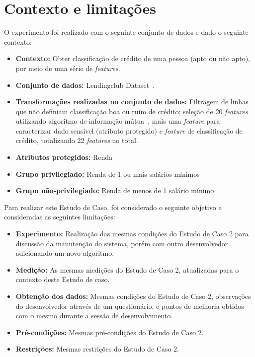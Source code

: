 \documentclass[portugues]{ic-tese}
\begin{document}
\section{Contexto e limitações}

O experimento foi realizado com o seguinte conjunto de dados e dado o seguinte contexto:

\begin{itemize}
\item \textbf{Contexto:} Obter classificação de crédito de uma pessoa (apto ou não apto), por meio de uma série de \textit{features}.

\item \textbf{Conjunto de dados:} Lendingclub Dataset~\citep{lendingclub_2022}.

\item \textbf{Transformações realizadas no conjunto de dados:} Filtragem de linhas que não definiam classificação boa ou ruim de crédito; seleção de 20 \textit{features} utilizando algoritmo de informação mútua~\citep{Ross_2014}, mais uma \textit{feature} para caracterizar dado sensível (atributo protegido) e \textit{feature} de classificação de crédito, totalizando 22 \textit{features} no total.

\item \textbf{Atributos protegidos:} Renda

\item \textbf{Grupo privilegiado:} Renda de 1 ou mais salários mínimos

\item \textbf{Grupo não-privilegiado:} Renda de menos de 1 salário mínimo

\end{itemize}

Para realizar este Estudo de Caso, foi considerado o seguinte objetivo e consideradas as seguintes limitações:

\begin{itemize}
\item \textbf{Experimento:} Realização das mesmas condições do Estudo de Caso 2 para discussão da manutenção do sistema, porém com outro desenvolvedor adicionando um novo algoritmo.

\item \textbf{Medição:} As mesmas medições do Estudo de Caso 2, atualizadas para o contexto deste Estudo de caso.

\item \textbf{Obtenção dos dados:} Mesmas condições do Estudo de Caso 2, observações do desenvolvedor através de um questionário, e pontos de melhoria obtidos com o mesmo durante a sessão de desenvolvimento.

\item \textbf{Pré-condições:} Mesmas pré-condições do Estudo de Caso 2.

\item \textbf{Restrições:} Mesmas restrições do Estudo de Caso 2.
\end{itemize}
\end{document}
